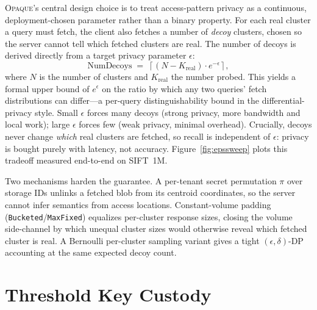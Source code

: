 \documentclass[11pt]{article}
\newcommand{\opaque}{\textsc{Opaque}}
\begin{document}
\opaque{}'s central design choice is to treat access-pattern privacy as a
continuous, deployment-chosen parameter rather than a binary property. For each
real cluster a query must fetch, the client also fetches a number of
\emph{decoy} clusters, chosen so the server cannot tell which fetched clusters
are real. The number of decoys is derived directly from a target privacy
parameter $\epsilon$:
\begin{equation}
  \text{NumDecoys} \;=\; \left\lceil (N - K_{\text{real}}) \cdot e^{-\epsilon} \right\rceil ,
  \label{eq:decoys}
\end{equation}
where $N$ is the number of clusters and $K_{\text{real}}$ the number probed.
This yields a formal upper bound of $e^{\epsilon}$ on the ratio by which any two
queries' fetch distributions can differ---a per-query distinguishability bound
in the differential-privacy style. Small $\epsilon$ forces many decoys (strong
privacy, more bandwidth and local work); large $\epsilon$ forces few (weak
privacy, minimal overhead). Crucially, decoys never change \emph{which} real
clusters are fetched, so recall is independent of $\epsilon$: privacy is bought
purely with latency, not accuracy. Figure~\ref{fig:epssweep} plots this
tradeoff measured end-to-end on SIFT~1M.

Two mechanisms harden the guarantee. A per-tenant secret permutation $\pi$ over
storage IDs unlinks a fetched blob from its centroid coordinates, so the server
cannot infer semantics from access locations. Constant-volume padding
(\texttt{Bucketed}/\texttt{MaxFixed}) equalizes per-cluster response sizes,
closing the volume side-channel by which unequal cluster sizes would otherwise
reveal which fetched cluster is real. A Bernoulli per-cluster sampling variant
gives a tight $(\epsilon,\delta)$-DP accounting at the same expected decoy
count.

\section{Threshold Key Custody}
\label{sec:threshold}
\end{document}

